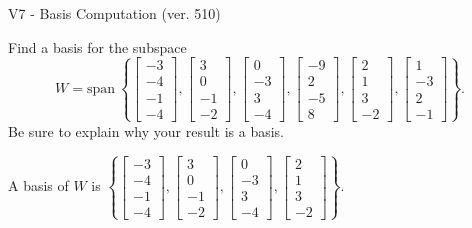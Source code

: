 \begin{exercise}
  \begin{exerciseTitle}V7 - Basis Computation (ver. 510)\end{exerciseTitle}
  \begin{exerciseStatement}
    Find a basis for the subspace 
\[W=\mathrm{span}\ \left\{\left[\begin{array}{r}
-3 \\
-4 \\
-1 \\
-4
\end{array}\right] , \left[\begin{array}{r}
3 \\
0 \\
-1 \\
-2
\end{array}\right] , \left[\begin{array}{r}
0 \\
-3 \\
3 \\
-4
\end{array}\right] , \left[\begin{array}{r}
-9 \\
2 \\
-5 \\
8
\end{array}\right] , \left[\begin{array}{r}
2 \\
1 \\
3 \\
-2
\end{array}\right] , \left[\begin{array}{r}
1 \\
-3 \\
2 \\
-1
\end{array}\right]\right\}.\]
 Be sure to explain why your result is a basis.


  \end{exerciseStatement}
  \begin{exerciseAnswer}
   A basis of \(W\) is  \(\left\{\left[\begin{array}{r}
-3 \\
-4 \\
-1 \\
-4
\end{array}\right] , \left[\begin{array}{r}
3 \\
0 \\
-1 \\
-2
\end{array}\right] , \left[\begin{array}{r}
0 \\
-3 \\
3 \\
-4
\end{array}\right] , \left[\begin{array}{r}
2 \\
1 \\
3 \\
-2
\end{array}\right]\right\}\).
  


  \end{exerciseAnswer}
\end{exercise}